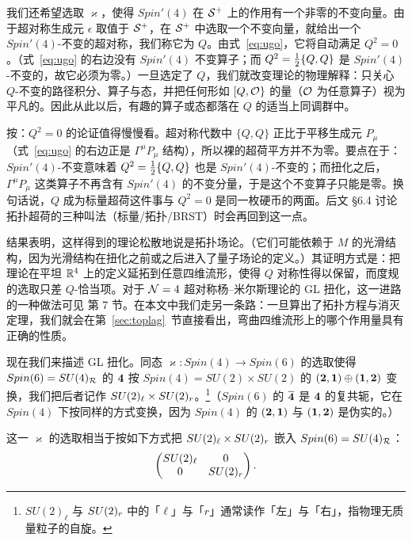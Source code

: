 我们还希望选取 $\varkappa$，使得 $Spin'(4)$ 在 ${\EUS}^+$ 上的作用有一个非零的不变向量。由于超对称生成元 $\epsilon$ 取值于 ${\EUS}^+$，在 ${\EUS}^+$ 中选取一个不变向量，就给出一个 $Spin'(4)$-不变的超对称，我们称它为 $Q$。由式~\eqref{eq:ugo}，它将自动满足 $Q^2=0$。（式~\eqref{eq:ugo} 的右边没有 $Spin'(4)$ 不变算子；而 $Q^2=\half\{Q,Q\}$ 是 $Spin'(4)$-不变的，故它必须为零。）一旦选定了 $Q$，我们就改变理论的物理解释：只关心 $Q$-不变的路径积分、算子与态，并把任何形如 $[Q,{\EUO}\}$ 的量（${\EUO}$ 为任意算子）视为平凡的。因此从此以后，有趣的算子或态都落在 $Q$ 的适当上同调群中。

\begin{yizhu}[含糊点拨]
按：$Q^2=0$ 的论证值得慢慢看。超对称代数中 $\{Q,Q\}$ 正比于平移生成元 $P_\mu$（式~\eqref{eq:ugo} 的右边正是 $\Gamma^\mu P_\mu$ 结构），所以裸的超荷平方并不为零。要点在于：$Spin'(4)$-不变意味着 $Q^2=\half\{Q,Q\}$ 也是 $Spin'(4)$-不变的；而扭化之后，$\Gamma^\mu P_\mu$ 这类算子不再含有 $Spin'(4)$ 的不变分量，于是这个不变算子只能是零。换句话说，$Q$ 成为标量超荷这件事与 $Q^2=0$ 是同一枚硬币的两面。后文 §6.4 讨论拓扑超荷的三种叫法（标量/拓扑/BRST）时会再回到这一点。
\end{yizhu}

结果表明，这样得到的理论松散地说是拓扑场论。（它们可能依赖于 $M$ 的光滑结构，因为光滑结构在扭化之前或之后进入了量子场论的定义。）其证明方式是：把理论在平坦 $\Bbb{R}^4$ 上的定义延拓到任意四维流形，使得 $Q$ 对称性得以保留，而度规的选取只差 $Q$-恰当项。对于 ${\EUN}=4$ 超对称杨--米尔斯理论的 GL 扭化，这一进路的一种做法可见 \cite{ref56} 第 7 节。在本文中我们走另一条路：一旦算出了拓扑方程与消灭定理，我们就会在第~\ref{sec:toplag}~节直接看出，弯曲四维流形上的哪个作用量具有正确的性质。

\par{}

现在我们来描述 GL 扭化。同态 $\varkappa:Spin(4)\to Spin(6)$ 的选取使得 $Spin(6)=SU(4)_{{\cal R}}$ 的 ${\bf 4}$ 按 $Spin(4)=SU(2)\times SU(2)$ 的 $({\bf 2},\bone)\oplus(\bone,{\bf 2})$ 变换，我们把后者记作 $SU(2)_\ell\times SU(2)_\rr$。\footnote{$SU(2)_\ell$ 与 $SU(2)_\rr$ 中的「$\ell$」与「$r$」通常读作「左」与「右」，指物理无质量粒子的自旋。}（$Spin(6)$ 的 $\bar{\bf 4}$ 是 ${\bf 4}$ 的复共轭，它在 $Spin(4)$ 下按同样的方式变换，因为 $Spin(4)$ 的 $({\bf 2},\bone)$ 与 $(\bone,{\bf 2})$ 是伪实的。）

这一 $\varkappa$ 的选取相当于按如下方式把 $SU(2)_\ell\times SU(2)_\rr$ 嵌入 $Spin(6)=SU(4)_{{\cal R}}$：
\setcounter{equation}{1}
\begin{equation}\label{eq:norml}
\left(\begin{matrix}SU(2)_\ell &  0 \\
                                                  0    &
                                                  SU(2)_\rr\\\end{matrix}\right).
\end{equation}

